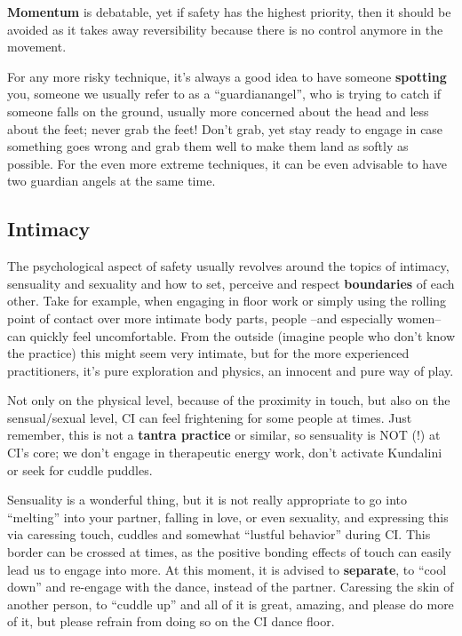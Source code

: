 \vspace{5pt}
\noindent \textbf{Momentum} is debatable, yet if safety has the highest priority, then it should be avoided as it takes away reversibility because there is no control anymore in the movement.

\vspace{10pt}

For any more risky technique, it's always a good idea to have someone \textbf{spotting} you, someone we usually refer to as a ``\gls{guardianangel}'', who is trying to catch if someone falls on the ground, usually more concerned about the head and less about the feet; never grab the feet!
Don't grab, yet stay ready to engage in case something goes wrong and grab them well to make them land as softly as possible.
For the even more extreme techniques, it can be even advisable to have two guardian angels at the same time.

\subsection{Intimacy}\label{subsec:intimacy}

The psychological aspect of safety usually revolves around the topics of intimacy, sensuality and sexuality and how to set, perceive and respect \textbf{boundaries} of each other.
Take for example, when engaging in floor work or simply using the rolling point of contact over more intimate body parts, people --and especially women-- can quickly feel uncomfortable.
From the outside (imagine people who don't know the practice) this might seem very intimate, but for the more experienced practitioners, it's pure exploration and physics, an innocent and pure way of play.

Not only on the physical level, because of the proximity in touch, but also on the sensual/sexual level, CI can feel frightening for some people at times.
Just remember, this is not a \textbf{tantra practice} or similar, so sensuality is NOT (!) at CI's core; we don't engage in therapeutic energy work, don't activate Kundalini or seek for cuddle puddles.

Sensuality is a wonderful thing, but it is not really appropriate to go into ``melting'' into your partner, falling in love, or even sexuality, and expressing this via caressing touch, cuddles and somewhat ``lustful behavior'' during CI\@.
This border can be crossed at times, as the positive bonding effects of touch can easily lead us to engage into more.
At this moment, it is advised to \textbf{separate}, to ``cool down'' and re-engage with the dance, instead of the partner.
Caressing the skin of another person, to ``cuddle up'' and all of it is great, amazing, and please do more of it, but please refrain from doing so on the CI dance floor.

